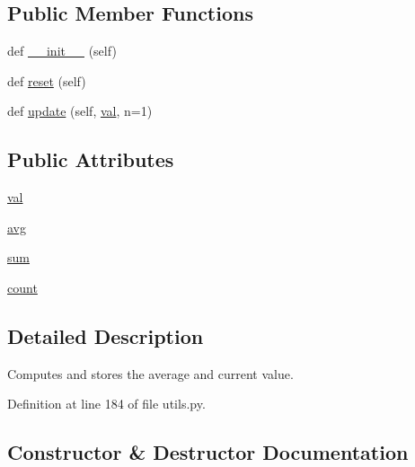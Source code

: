 \subsection*{Public Member Functions}
\begin{DoxyCompactItemize}
\item 
def \hyperlink{classparlai_1_1agents_1_1drqa_1_1utils_1_1AverageMeter_a5d31ec2b9b8020da43ab0ca600cbe561}{\+\_\+\+\_\+init\+\_\+\+\_\+} (self)
\item 
def \hyperlink{classparlai_1_1agents_1_1drqa_1_1utils_1_1AverageMeter_adf03b2f21b820b30c0bf68334bda0b6e}{reset} (self)
\item 
def \hyperlink{classparlai_1_1agents_1_1drqa_1_1utils_1_1AverageMeter_a5a66f2a884034fcdf004468a980d1318}{update} (self, \hyperlink{classparlai_1_1agents_1_1drqa_1_1utils_1_1AverageMeter_a0b98a68fd8e5d78852462e6ab3822760}{val}, n=1)
\end{DoxyCompactItemize}
\subsection*{Public Attributes}
\begin{DoxyCompactItemize}
\item 
\hyperlink{classparlai_1_1agents_1_1drqa_1_1utils_1_1AverageMeter_a0b98a68fd8e5d78852462e6ab3822760}{val}
\item 
\hyperlink{classparlai_1_1agents_1_1drqa_1_1utils_1_1AverageMeter_aee254ce04bba670cb5839d0d8b602906}{avg}
\item 
\hyperlink{classparlai_1_1agents_1_1drqa_1_1utils_1_1AverageMeter_ab4cfd9c6c69772ef8828a14e3217508a}{sum}
\item 
\hyperlink{classparlai_1_1agents_1_1drqa_1_1utils_1_1AverageMeter_a4b3a149e43ba378d8cc4af3885e0c68f}{count}
\end{DoxyCompactItemize}


\subsection{Detailed Description}
\begin{DoxyVerb}Computes and stores the average and current value.
\end{DoxyVerb}
 

Definition at line 184 of file utils.\+py.



\subsection{Constructor \& Destructor Documentation}
\mbox{\label{classparlai_1_1agents_1_1drqa_1_1utils_1_1AverageMeter_a5d31ec2b9b8020da43ab0ca600cbe561}} 
